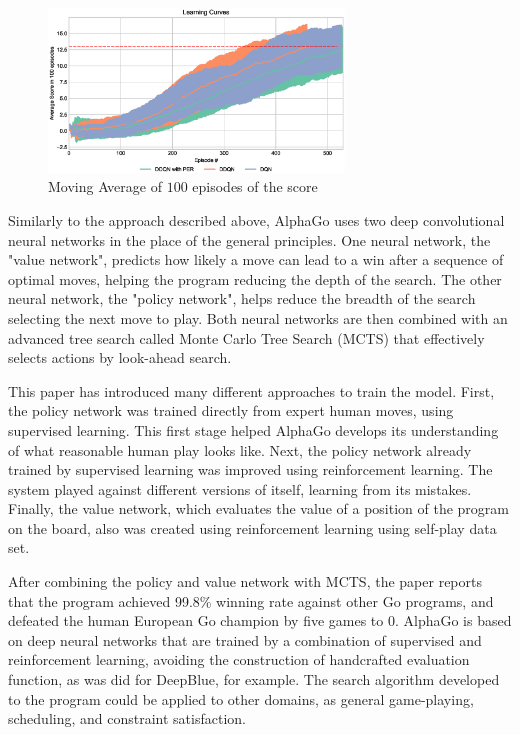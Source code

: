 \documentclass[a4paper]{article}
\begin{document}
\begin{figure}[ht]
\centering
\includegraphics[width=0.7\textwidth]{../notebooks/figures/2018-08-23-final-comparition.eps}
\caption{Moving Average of $100$ episodes of the score}
\label{fig:rwd_funcs}
\end{figure}


Similarly to the approach described above, AlphaGo uses two deep convolutional neural networks in the place of the general principles. One neural network, the "value network", predicts how likely a move can lead to a win after a sequence of optimal moves, helping the program reducing the depth of the search. The other neural network, the "policy network", helps reduce the breadth of the search selecting the next move to play. Both neural networks are then combined with an advanced tree search called Monte Carlo Tree Search (MCTS) that effectively selects actions by look-ahead search.




This paper has introduced many different approaches to train the model. First, the policy network was trained directly from expert human moves, using supervised learning. This first stage helped AlphaGo develops its understanding of what reasonable human play looks like. Next, the policy network already trained by supervised learning was improved using reinforcement learning. The system played against different versions of itself, learning from its mistakes. Finally, the value network, which evaluates the value of a position of the program on the board, also was created using reinforcement learning using self-play data set.

After combining the policy and value network with MCTS, the paper reports that the program achieved 99.8\% winning rate against other Go programs, and defeated the human European Go champion by five games to 0. AlphaGo is based on deep neural networks that are trained by a combination of supervised and reinforcement learning, avoiding the construction of handcrafted evaluation function, as was did for DeepBlue, for example. The search algorithm developed to the program could be applied to other domains, as general game-playing, scheduling, and constraint satisfaction.








\end{document}
